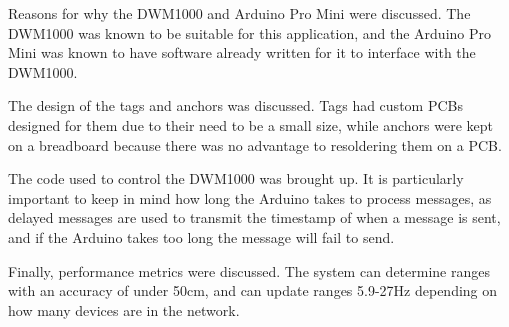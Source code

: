 Reasons for why the DWM1000 and Arduino Pro Mini were discussed. The DWM1000 was known to be suitable for this application, and the Arduino Pro Mini was known to have software already written for it to interface with the DWM1000.

The design of the tags and anchors was discussed. Tags had custom PCBs designed for them due to their need to be a small size, while anchors were kept on a breadboard because there was no advantage to resoldering them on a PCB.

The code used to control the DWM1000 was brought up. It is particularly important to keep in mind how long the Arduino takes to process messages, as delayed messages are used to transmit the timestamp of when a message is sent, and if the Arduino takes too long the message will fail to send.

Finally, performance metrics were discussed. The system can determine ranges with an accuracy of under 50cm, and can update ranges 5.9-27Hz depending on how many devices are in the network.

